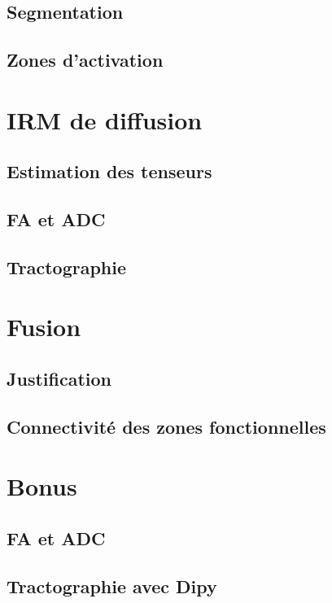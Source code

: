 \documentclass[a4paper]{article}
\begin{document}



\subsection{Segmentation}

\subsection{Zones d'activation}

\section{IRM de diffusion}

\subsection{Estimation des tenseurs}

\subsection{FA et ADC}

\subsection{Tractographie}

\section{Fusion}

\subsection{Justification}

\subsection{Connectivité des zones fonctionnelles}

\section{Bonus}

\subsection{FA et ADC}

\subsection{Tractographie avec Dipy}
\end{document}
